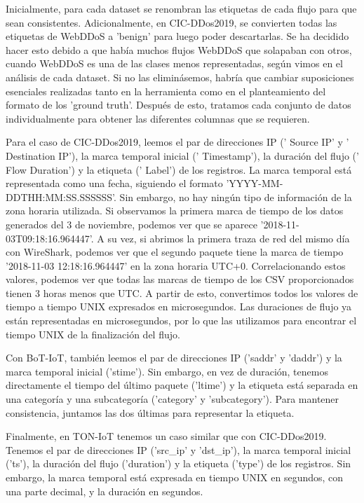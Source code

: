Inicialmente, para cada dataset se renombran las etiquetas de cada flujo para que sean consistentes. Adicionalmente, en CIC-DDos2019, se convierten todas las etiquetas de WebDDoS a 'benign' para luego poder descartarlas. Se ha decidido hacer esto debido a que había muchos flujos WebDDoS que solapaban con otros, cuando WebDDoS es una de las clases menos representadas, según vimos en el análisis de cada dataset. Si no las eliminásemos, habría que cambiar suposiciones esenciales realizadas tanto en la herramienta como en el planteamiento del formato de los 'ground truth'. Después de esto, tratamos cada conjunto de datos individualmente para obtener las diferentes columnas que se requieren.

Para el caso de CIC-DDos2019, leemos el par de direcciones IP (' Source IP' y ' Destination IP'), la marca temporal inicial (' Timestamp'), la duración del flujo (' Flow Duration') y la etiqueta (' Label') de los registros. La marca temporal está representada como una fecha, siguiendo el formato 'YYYY-MM-DDTHH:MM:SS.SSSSSS'. Sin embargo, no hay ningún tipo de información de la zona horaria utilizada. Si observamos la primera marca de tiempo de los datos generados del 3 de noviembre, podemos ver que se aparece '2018-11-03T09:18:16.964447'. A su vez, si abrimos la primera traza de red del mismo día con WireShark, podemos ver que el segundo paquete tiene la marca de tiempo '2018-11-03 12:18:16.964447' en la zona horaria UTC+0. Correlacionando estos valores, podemos ver que todas las marcas de tiempo de los CSV proporcionados tienen 3 horas menos que UTC. A partir de esto, convertimos todos los valores de tiempo a tiempo UNIX expresados en microsegundos. Las duraciones de flujo ya están representadas en microsegundos, por lo que las utilizamos para encontrar el tiempo UNIX de la finalización del flujo.

Con BoT-IoT, también leemos el par de direcciones IP ('saddr' y 'daddr') y la marca temporal inicial ('stime'). Sin embargo, en vez de duración, tenemos directamente el tiempo del último paquete ('ltime') y la etiqueta está separada en una categoría y una subcategoría ('category' y 'subcategory'). Para mantener consistencia, juntamos las dos últimas para representar la etiqueta.

Finalmente, en TON-IoT tenemos un caso similar que con CIC-DDos2019. Tenemos el par de direcciones IP  ('src\_ip' y 'dst\_ip'), la marca temporal inicial ('ts'), la duración del flujo ('duration') y la etiqueta ('type') de los registros. Sin embargo, la marca temporal está expresada en tiempo UNIX en segundos, con una parte decimal, y la duración en segundos.

